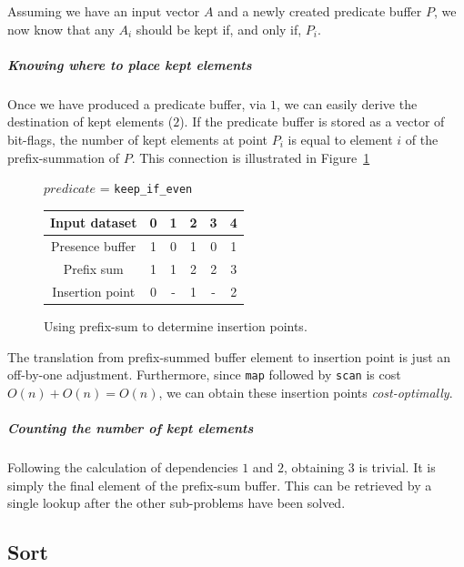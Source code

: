 Assuming we have an input vector $A$ and a newly created predicate buffer $P$, we now know that any $A_i$ should be kept if, and only if, $P_i$.

\subparagraph*{Knowing where to place kept elements}
Once we have produced a predicate buffer, via $1$, we can easily derive the destination of kept elements ($2$). If the predicate buffer is stored as a vector of bit-flags, the number of kept elements at point $P_i$ is equal to element $i$ of the prefix-summation of $P$. This connection is illustrated in Figure~\ref{fig:wheretoplace}

\begin{figure}[h]
\begin{center}
  \caption{Using prefix-sum to determine insertion points.}
  \label{fig:wheretoplace}

  $predicate$ = \verb|keep_if_even|
  \vskip 10pt
  \begin{tabular}{ | c | c | c | c | c | c |}
    \hline
    Input dataset   & 0 & 1 & 2 & 3 & 4 \\ \hline
    Presence buffer & 1 & 0 & 1 & 0 & 1 \\ \hline
    Prefix sum      & 1 & 1 & 2 & 2 & 3 \\ \hline
    Insertion point & 0 & - & 1 & - & 2 \\ \hline
  \end{tabular}
\end{center}
\end{figure}

The translation from prefix-summed buffer element to insertion point is just an off-by-one adjustment.
Furthermore, since \verb|map| followed by \verb|scan| is cost $O(n) + O(n) = O(n)$, we can obtain these insertion points \emph{cost-optimally}.

\subparagraph*{Counting the number of kept elements}
Following the calculation of dependencies $1$ and $2$, obtaining $3$ is trivial. It is simply the final element of the prefix-sum buffer. This can be retrieved by a single lookup after the other sub-problems have been solved.


\subsection{Sort}
